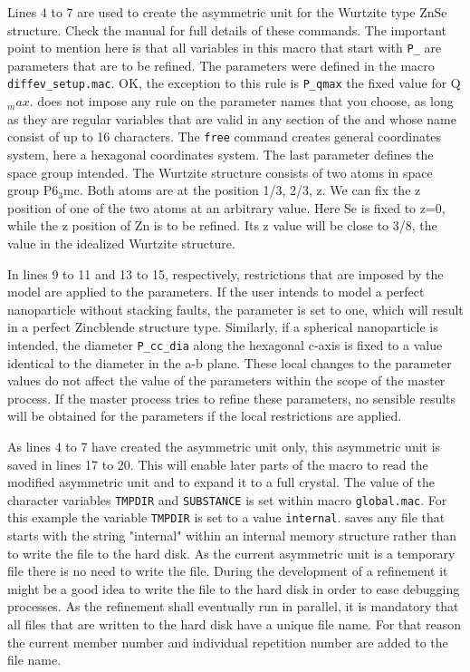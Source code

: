 Lines 4 to 7 are used to create the asymmetric unit for the Wurtzite type ZnSe 
structure. Check the \Discus manual for full details of these commands. The 
important point to mention here is that all variables in this macro that start
with {\tt P\_} are parameters that are to be refined. The parameters were
defined in the macro {\tt diffev\_setup.mac}. OK, the exception to this
rule is {\tt P\_qmax} the fixed value for Q$_max$. \Diffev does not impose any
rule on the parameter names that you choose, as long as they are regular variables
that are valid in any section of the \Suite and whose name consist of up to 16
characters.  The {\tt free} command creates general coordinates system, here a
hexagonal coordinates system. The last parameter defines the space group intended.
The Wurtzite structure consists of two atoms in space group P6$_3$mc. Both atoms
are at the position 1/3, 2/3, z. We can fix the z position of one of the two 
atoms at an arbitrary value. Here Se is fixed to z=0, while the z position of
Zn is to be refined. Its z value will be close to 3/8, the value in the 
idealized Wurtzite structure.

In lines 9 to 11 and 13 to 15, respectively, restrictions that are imposed by
the model are applied to the parameters. If the user intends to model a 
perfect nanoparticle without stacking faults, the parameter is set to one, 
which will result in a perfect Zincblende structure type. Similarly, if a 
spherical nanoparticle is intended, the diameter {\tt P\_cc\_dia} along the 
hexagonal c-axis is fixed to a value identical to the diameter in the a-b plane.
These local changes to the parameter values do not affect the value of the 
parameters within the scope of the master process. If the master process tries to
refine these parameters, no sensible results will be obtained for the parameters
if the local restrictions are applied.

As lines 4 to 7 have created the asymmetric unit only, this asymmetric unit is
saved in lines 17 to 20. This will enable later parts of the macro to read the
modified asymmetric unit and to expand it to a full crystal. The value of 
the character variables {\tt TMPDIR} and {\tt SUBSTANCE} is set within macro
{\tt global.mac}. For this example the variable {\tt TMPDIR} is set to a value
{\tt internal}. \Discus saves any file that starts with the string "internal" 
within an internal memory structure rather than to write the file to the hard
disk. As the current asymmetric unit is a temporary file there is no need to 
write the file. During the development of a refinement it might be a good idea
to write the file to the hard disk in order to ease debugging processes. As 
the refinement shall eventually run in parallel, it is mandatory that all files
that are written to the hard disk have a unique file name. For that reason the 
current member number and individual repetition number are added to the file
name.

